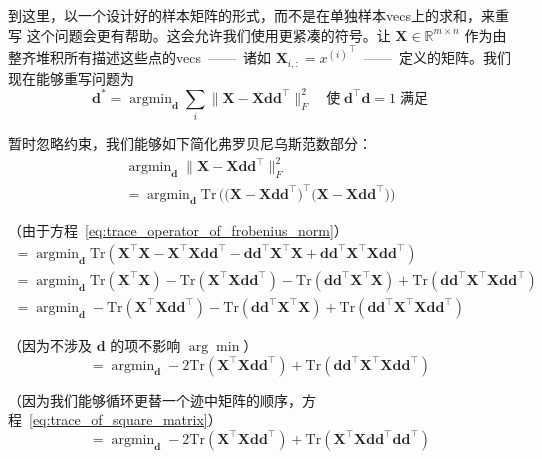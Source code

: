 到这里，以一个设计好的样本矩阵的形式，而不是在单独样本\gls*{vecs}上的求和，来重写
这个问题会更有帮助。这会允许我们使用更紧凑的符号。让 $\pmb{X} \in \mathbb{R}^{m
  \times n}$ 作为由整齐堆积所有描述这些点的\gls*{vecs}~——~诸如
$\pmb{X}_{i,:} = {x^{(i)}}^{\top}$~——~定义的矩阵。我们现在能够重写问题为
\begin{equation}
  \pmb{d}^* = \mathop{\arg\min}_{\pmb{d}}\sum_i\|\pmb{X} -
  \pmb{X}\pmb{d}\pmb{d}^{\top}\|^2_F\quad\text{使}\;\pmb{d}^{\top}\pmb{d} =
  1\;\text{满足}
\end{equation}

暂时忽略约束，我们能够如下简化弗罗贝尼乌斯范数部分：
\begin{gather}
  \mathop{\arg\min}_{\pmb{d}}\|\pmb{X} - \pmb{X}\pmb{d}\pmb{d}^{\top}\|^2_F\\ =
  \mathop{\arg\min}_{\pmb{d}}\mathrm{Tr}\,\bigg(\Big(\pmb{X} -
  \pmb{X}\pmb{d}\pmb{d}^{\top}\Big)^{\top}\Big(\pmb{X} -
  \pmb{X}\pmb{d}\pmb{d}^{\top}\Big)\bigg)
\end{gather}

（由于方程~\ref{eq:trace_operator_of_frobenius_norm}）
\begin{gather}
  = \mathop{\arg\min}_{\pmb{d}}\mathrm{Tr}(\pmb{X}^{\top}\pmb{X} -
  \pmb{X}^{\top}\pmb{X}\pmb{d}\pmb{d}^{\top} -
  \pmb{d}\pmb{d}^{\top}\pmb{X}^{\top}\pmb{X} +
  \pmb{d}\pmb{d}^{\top}\pmb{X}^{\top}\pmb{X}\pmb{d}\pmb{d}^{\top})\\ =
  \mathop{\arg\min}_{\pmb{d}}\mathrm{Tr}(\pmb{X}^{\top}\pmb{X}) -
  \mathrm{Tr}(\pmb{X}^{\top}\pmb{X}\pmb{d}\pmb{d}^{\top}) -
  \mathrm{Tr}(\pmb{d}\pmb{d}^{\top}\pmb{X}^{\top}\pmb{X}) +
  \mathrm{Tr}(\pmb{d}\pmb{d}^{\top}\pmb{X}^{\top}\pmb{X}\pmb{d}\pmb{d}^{\top})\\ =
  \mathop{\arg\min}_{\pmb{d}} -
  \mathrm{Tr}(\pmb{X}^{\top}\pmb{X}\pmb{d}\pmb{d}^{\top}) -
  \mathrm{Tr}(\pmb{d}\pmb{d}^{\top}\pmb{X}^{\top}\pmb{X}) +
  \mathrm{Tr}(\pmb{d}\pmb{d}^{\top}\pmb{X}^{\top}\pmb{X}\pmb{d}\pmb{d}^{\top})
\end{gather}

（因为不涉及 $\pmb{d}$ 的项不影响 $\arg\min$）
\begin{equation}
  = \mathop{\arg\min}_{\pmb{d}} -
  2\mathrm{Tr}(\pmb{X}^{\top}\pmb{X}\pmb{d}\pmb{d}^{\top}) +
  \mathrm{Tr}(\pmb{d}\pmb{d}^{\top}\pmb{X}^{\top}\pmb{X}\pmb{d}\pmb{d}^{\top})
\end{equation}

（因为我们能够循环更替一个迹中矩阵的顺序，方程~\ref{eq:trace_of_square_matrix}）
\begin{equation}
  = \mathop{\arg\min}_{\pmb{d}} -
  2\mathrm{Tr}(\pmb{X}^{\top}\pmb{X}\pmb{d}\pmb{d}^{\top}) +
  \mathrm{Tr}(\pmb{X}^{\top}\pmb{X}\pmb{d}\pmb{d}^{\top}\pmb{d}\pmb{d}^{\top})
\end{equation}

